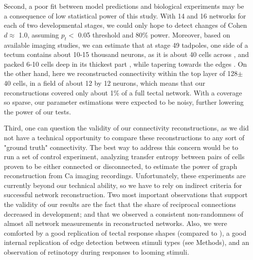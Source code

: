 \documentclass{article}
\begin{document}
Second, a poor fit between model predictions and biological experiments may be a consequence of low statistical power of this study. With 14 and 16 networks for each of two developmental stages, we could only hope to detect changes of Cohen $d \approx$ 1.0, assuming $p_t<$ 0.05 threshold and 80\% power. Moreover, based on available imaging studies, we can estimate that at stage 49 tadpoles, one side of a tectum contains about 10-15 thousand neurons, as it is about 40 cells across \citep{hiramoto2009}, and packed 6-10 cells deep in its thickest part \citep{hewapathirane2008vivo}, while tapering towards the edges \citep{bollmann2009}. On the other hand, here we reconstructed connectivity within the top layer of 128$\pm$40 cells, in a field of about 12 by 12 neurons, which means that our reconstructions covered only about 1\% of a full tectal network. With a coverage so sparse, our parameter estimations were expected to be noisy, further lowering the power of our tests.

Third, one can question the validity of our connectivity reconstructions, as we did not have a technical opportunity to compare these reconstructions to any sort of "ground truth" connectivity. The best way to address this concern would be to run a set of control experiment, analyzing transfer entropy between pairs of cells proven to be either connected or disconnected, to estimate the power of graph reconstruction from Ca imaging recordings. Unfortunately, these experiments are currently beyond our technical ability, so we have to rely on indirect criteria for successful network reconstruction. Two most important observations that support the validity of our results are the fact that the share of reciprocal connections decreased in development; and that we observed a consistent non-randomness of almost all network measurements in reconstructed networks. Also, we were comforted by a good replication of tectal response shapes (compared to \citep{khakhalin2014}), a good internal replication of edge detection between stimuli types (see Methods), and an observation of retinotopy during responses to looming stimuli.
\end{document}

